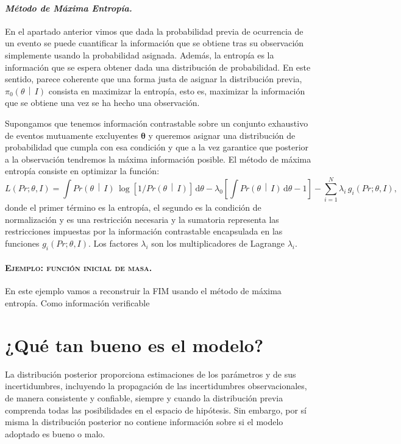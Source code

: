 \documentclass[a4paper,twoside]{article}
\newcommand{\hip}{\ensuremath{\mathbold{\theta}}\xspace}
\newcommand{\pri}[2]{\ensuremath{\pi_0\left(#1\,\middle|\, #2\right)}\xspace}
\newcommand{\pro}[2]{\ensuremath{Pr\left(#1\,\middle|\, #2\right)}\xspace}
\begin{document}
\paragraph{\textit{\color{teal}Método de Máxima Entropía.}} En el apartado anterior vimos que dada
la probabilidad previa de ocurrencia de un evento se puede cuantificar la información que se obtiene
tras su observación simplemente usando la probabilidad asignada. Además, la entropía es la
información que se espera obtener dada una distribución de probabilidad. En este sentido, parece
coherente que una forma justa de asignar la distribución previa, $\pri{\theta}{I}$ consista en
maximizar la entropía, esto es, maximizar la información que se obtiene una vez se ha hecho una
observación.

Supongamos que tenemos información contrastable sobre un conjunto exhaustivo de eventos mutuamente
excluyentes $\hip$ y queremos asignar una distribución de probabilidad que cumpla con esa condición
y que a la vez garantice que posterior a la observación tendremos la máxima información posible. El
método de máxima entropía consiste en optimizar la función:
%
$$L(Pr;\theta,I) = \int\pro{\theta}{I}\,\log{\left[1/\pro{\theta}{I}\right]}\,\text{d}\theta - \lambda_0\left[\int\pro{\theta}{I}\,\text{d}\theta-1\right] - \sum_{i=1}^N \lambda_i\,g_i(Pr;\theta,I),$$
%
donde el primer término es la entropía, el segundo es la condición de normalización y es una
restricción necesaria y la sumatoria representa las restricciones impuestas por la información
contrastable encapsulada en las funciones $g_i(Pr;\theta,I)$. Los factores $\lambda_i$ son los
multiplicadores de Lagrange $\lambda_i$.

\paragraph{\textsc{\color{Blue}Ejemplo: función inicial de masa.}} En este ejemplo vamos a
reconstruir la FIM usando el método de máxima entropía. Como información verificable


\section*{¿Qué tan bueno es el modelo?}

La distribución posterior proporciona estimaciones de los parámetros y de sus incertidumbres,
incluyendo la propagación de las incertidumbres observacionales, de manera consistente y confiable,
siempre y cuando la distribución previa comprenda todas las posibilidades en el espacio de
hipótesis. Sin embargo, por sí misma la distribución posterior no contiene información sobre si el
modelo adoptado es bueno o malo.
\end{document}
